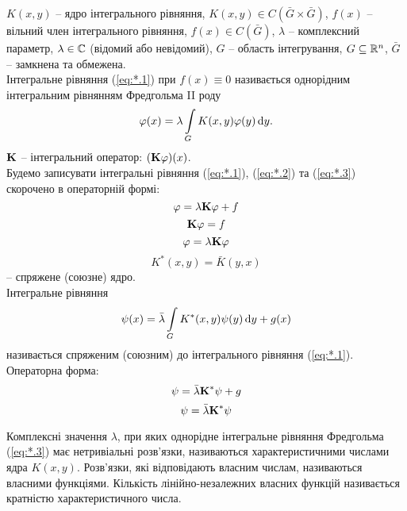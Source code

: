 $K(x, y)$ -- ядро інтегрального рівняння, $K(x, y) \in C(\bar G \times \bar G)$, $f(x)$ -- вільний член інтегрального рівняння, $f(x) \in C(\bar G)$, $\lambda$ -- комплексний параметр, $\lambda \in \CC$ (відомий або невідомий), $G$ -- область інтегрування, $G \subseteq \RR^n$, $\bar G$ -- замкнена та обмежена. \\

Інтегральне рівняння (\ref{eq:*.1}) при $f(x) \equiv 0$ називається однорідним інтегральним рівнянням Фредгольма II роду
\begin{equation}
	\label{eq:*.3}
	\phi(x) = \lambda \Int_G K(x, y) \phi(y) \diff y.
\end{equation}
$\bf{K}$ -- інтегральний оператор: $(\bf{K} \phi)(x)$. \\

Будемо записувати інтегральні рівняння (\ref{eq:*.1}), (\ref{eq:*.2}) та (\ref{eq:*.3}) скорочено в операторній формі:
\begin{equation}
	\label{eq:*.1'}
	\phi = \lambda \bf{K} \phi + f
\end{equation}
\begin{equation}
	\label{eq:*.2'}
	\bf{K} \phi = f
\end{equation}
\begin{equation}
	\label{eq:*.3'}
	\phi = \lambda \bf{K} \phi
\end{equation}
\begin{equation}
	\label{eq:*.4}
	K^*(x, y) = \bar K(y, x)
\end{equation}
-- спряжене (союзне) ядро. \\

Інтегральне рівняння
\begin{equation}
	\label{eq:*.5}
	\psi(x) = \bar \lambda \Int_G K^*(x, y) \psi(y) \diff y + g(x)
\end{equation}
називається спряженим (союзним) до інтегрального рівняння (\ref{eq:*.1}). \\

Операторна форма:
\begin{equation}
	\label{eq:*.5'}
	\psi = \bar \lambda \bf{K}^* \psi + g
\end{equation}
\begin{equation}
	\label{eq:*.6}
	\psi = \bar \lambda \bf{K}^* \psi
\end{equation}

\begin{definition*}
	Комплексні значення $\lambda$, при яких однорідне інтегральне рівняння Фредгольма (\ref{eq:*.3}) має нетривіальні розв’язки, називаються характеристичними числами ядра $K(x, y)$. Розв’язки, які відповідають власним числам, називаються власними функціями. Кількість лінійно-незалежних власних функцій називається кратністю характеристичного числа.
\end{definition*}


